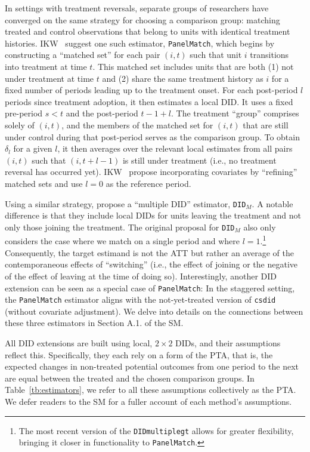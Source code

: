 \documentclass[12pt]{article}
\begin{document}
In settings with treatment reversals, separate groups of researchers have converged on the same strategy for choosing a comparison group: matching treated and control observations that belong to units with identical treatment histories. IKW~\citeyearpar{IKW2021} suggest one such estimator, \texttt{PanelMatch}, which begins by constructing a ``matched set'' for each pair $(i,t)$ such that unit $i$ transitions into treatment at time $t$. This matched set includes units that are both (1) not under treatment at time $t$ and (2) share the same treatment history as $i$ for a fixed number of periods leading up to the treatment onset. For each post-period $l$ periods since treatment adoption, it then estimates a local DID. It uses a fixed pre-period $s<t$ and the post-period $t-1+l$. The treatment ``group'' comprises solely of $(i,t)$, and the members of the matched set for $(i,t)$ that are still under control during that post-period serves as the comparison group. To obtain $\delta_l$ for a given $l$, it then averages over the relevant local estimates from all pairs $(i,t)$ such that $(i,t+l-1)$ is still under treatment (i.e., no treatment reversal has occurred yet). IKW~\citeyearpar{IKW2021} propose incorporating covariates by ``refining'' matched sets and use $l=0$ as the reference period.

Using a similar strategy, \citet{CDH2020} propose a ``multiple DID'' estimator, \texttt{DID$_M$}. A notable difference is that they include local DIDs for units leaving the treatment and not only those joining the treatment. The original proposal for \texttt{DID$_M$} also only considers the case where we match on a single period and where $l=1$.\footnote{The most recent version of the \texttt{DIDmultiplegt} allows for greater flexibility, bringing it closer in functionality to \texttt{PanelMatch}.} Consequently, the target estimand is not the ATT but rather an average of the contemporaneous effects of ``switching'' (i.e., the effect of joining or the negative of the effect of leaving at the time of doing so). Interestingly, another DID extension can be seen as a special case of \texttt{PanelMatch}: In the staggered setting, the \texttt{PanelMatch} estimator aligns with the not-yet-treated version of \texttt{csdid} (without covariate adjustment). We delve into details on the connections between these three estimators in Section A.1. of the SM.

All DID extensions are built using local, $2\times 2$ DIDs, and their assumptions reflect this. Specifically, they each rely on a form of the PTA, that is, the expected changes in non-treated potential outcomes from one period to the next are equal between the treated and the chosen comparison groups. In Table~\ref{tb:estimators}, we refer to all these assumptions collectively as the
PTA. We defer readers to the SM for a fuller account of each method's assumptions.
\end{document}
